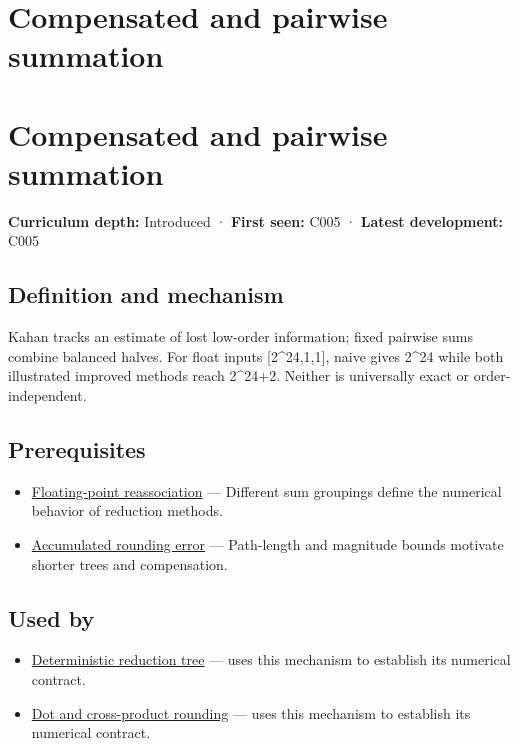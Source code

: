 \hypertarget{appendix-df318da57389}{}
\section*{Compensated and pairwise summation}
\section{Compensated and pairwise summation}\label{compensated-and-pairwise-summation}

\textbf{Curriculum depth:} Introduced · \textbf{First seen:} C005 · \textbf{Latest development:} C005

\subsection{Definition and mechanism}\label{definition-and-mechanism}

Kahan tracks an estimate of lost low-order information; fixed pairwise sums combine balanced halves. For float inputs {[}2\^{}24,1,1{]}, naive gives 2\^{}24 while both illustrated improved methods reach 2\^{}24+2. Neither is universally exact or order-independent.

\subsection{Prerequisites}\label{prerequisites}

\begin{itemize}
\tightlist
\item
  \hyperref[appendix-c2ac4a84c283]{Floating-point reassociation} --- Different sum groupings define the numerical behavior of reduction methods.
\item
  \hyperref[appendix-f82e270791c8]{Accumulated rounding error} --- Path-length and magnitude bounds motivate shorter trees and compensation.
\end{itemize}

\subsection{Used by}\label{used-by}

\begin{itemize}
\tightlist
\item
  \hyperref[appendix-4c8e0238e7ee]{Deterministic reduction tree} --- uses this mechanism to establish its numerical contract.
\item
  \hyperref[appendix-5aef4f13483a]{Dot and cross-product rounding} --- uses this mechanism to establish its numerical contract.
\end{itemize}

